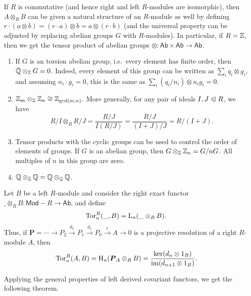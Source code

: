 If $R$ is commutative (and hence right and left $R$-modules are isomorphic), then $A\otimes_R B$ can be given a natural structure of an $R$-module as well by defining $r\cdot(a\otimes b)=(r\cdot a)\otimes b=a\otimes (r\cdot b)$ (and the universal property can be adjusted by replacing abelian groups $G$ with $R$-modules).  In particular, if $R=\mathbb{Z}$, then we get the tensor product of abelian groups $\otimes:\mathsf{Ab}\times \mathsf{Ab}\to \mathsf{Ab}$.

\begin{example}
    \begin{enumerate}
        \item If $G$ is an torsion abelian group, i.e.~every element has finite order, then $\mathbb{Q}\otimes_{\mathbb{Z}} G=0$. Indeed, every element of this group can be written as $\sum_i q_i\otimes g_i$, and assuming $n_i\cdot g_i=0$, this is the same as $\sum_i (q_i/n_i)\otimes n_ig_i=0$.
        \item $\mathbb{Z}_m\otimes_{\mathbb{Z}} \mathbb{Z}_n\cong \mathbb{Z}_{\gcd(m,n)}$. More generally, for any pair of ideals $I,J\trianglelefteqslant R$, we have
         \[R\slash I\otimes_R R\slash J=\frac{R\slash J}{I(R\slash J)}=\frac{R\slash J}{(I+J)/J}=R\slash(I+J).\]
        \item Tensor products with the cyclic groups can be used to control the order of elements of groups. If $G$ is an abelian group, then $G\otimes_{\mathbb{Z}} \mathbb{Z}_n=G\slash nG$. All multiples of $n$ in this group are zero.
        \item $\mathbb{Q}\otimes_{\mathbb{Z}}\mathbb{Q}=\mathbb{Q}\otimes_{\mathbb{Q}}\mathbb{Q}$. 
    \end{enumerate}
\end{example}


\begin{defn}
    Let $B$ be a left $R$-module and consider the right exact functor $\_\otimes_R B:\mathsf{Mod-}R\to \mathsf{Ab}$, and define
    \[\operatorname{Tor}_n^R(\_,B)=\mathrm{L}_n(\_\otimes_R B).\]
    Thus, if $\bm{P}=\cdots\to P_2\overset{d_2}{\to}P_1\overset{d_1}{\to}P_0\overset{\epsilon}{\to}A\to 0$ is a projective resolution of a right $R$-module $A$, then
    \[\operatorname{Tor}_n^R(A,B)=\mathrm{H}_n(\boldsymbol{P}_A\otimes_R B)=\frac{\ker(d_n\otimes 1_B)}{\operatorname{im}(d_{n+1}\otimes 1_B)}.\]
\end{defn}

Applying the general properties of left derived covariant functors, we get the following theorem.

